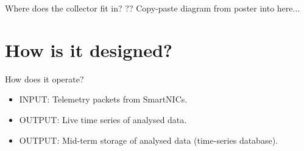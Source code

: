 \documentclass[aspectratio=169,xcolor={dvipsnames}
,notes
,handout
]{beamer}
\begin{document}

\begin{frame}{Where does the collector fit in?}
	?? Copy-paste diagram from poster into here...
\end{frame}

\section{How is it designed?}

\begin{frame}{How does it operate?}
	\begin{itemize}[<+- | alert@+>]
		\item INPUT: Telemetry packets from SmartNICs.
		\item OUTPUT: Live time series of analysed data.
		\item OUTPUT: Mid-term storage of analysed data (\alert{time-series database}).
	\end{itemize}
\end{frame}

\end{document}
